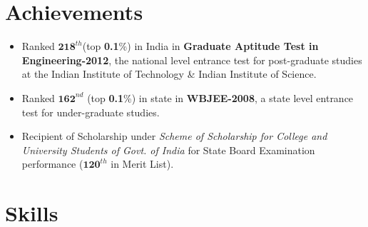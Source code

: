 \documentclass[margin,line]{resume}
\begin{document}
\begin{resume}
	\section{\mysidestyle Achievements}
\begin{itemize}[topsep=2pt, partopsep=1pt, itemsep=2pt, parsep=1pt, leftmargin=15pt]
    \item Ranked $\textbf{218}^{th}$(top \textbf{0.1}\%) in India in \textbf{Graduate Aptitude Test in Engineering-2012}, the national level entrance test for post-graduate studies at the Indian Institute of Technology \& {Indian Institute of Science}.
    \item Ranked $\textbf{162}^{nd}$ (top \textbf{0.1}\%) in state in \textbf{WBJEE-2008}, a state level entrance test for under-graduate studies.
    \item Recipient of Scholarship under \textit{Scheme of Scholarship for College and University Students of Govt. of India}  for State Board Examination performance ($\textbf{120}^{th}$ in Merit List).
	\end{itemize}
%
%




    \section{\mysidestyle Skills}


\end{resume}
\end{document}
